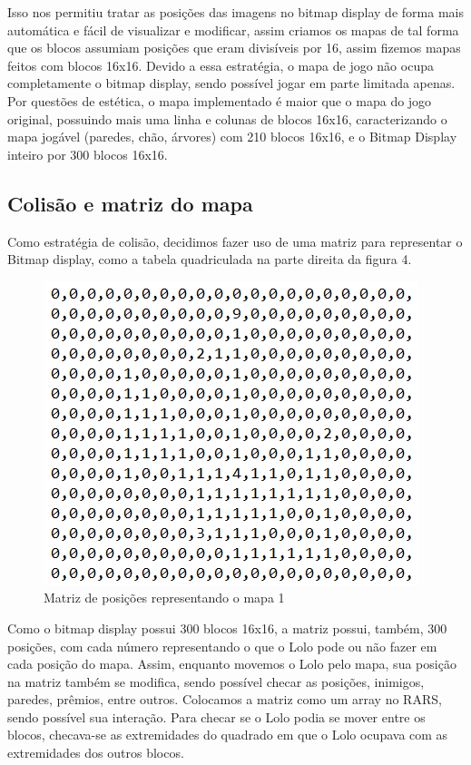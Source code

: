 \documentclass[10pt, conference, compsocconf]{IEEEtran}
\begin{document}
{{Isso nos permitiu tratar as posições das imagens no bitmap display de forma mais
automática e fácil de visualizar e modificar, assim criamos os mapas de tal
forma que os blocos assumiam posições que eram divisíveis por 16, assim fizemos
mapas feitos com blocos 16x16. Devido a essa estratégia, o mapa de jogo não
ocupa completamente o bitmap display, sendo possível jogar em parte limitada
apenas. Por questões de estética, o mapa implementado é maior que o mapa do jogo
original, possuindo mais uma linha e colunas de blocos 16x16, caracterizando o
mapa jogável (paredes, chão, árvores) com 210 blocos 16x16, e o Bitmap Display
inteiro por 300 blocos 16x16.

}




\subsection{Colisão e matriz do mapa}{
\label{sec:Mars}
Como estratégia de colisão, decidimos fazer uso de
uma matriz para representar o Bitmap display, como
a tabela quadriculada na parte direita da figura 4.

\begin{figure}[htb]
  \begin{center}
   \includegraphics[width=0.5\linewidth]{./Figures/image_7.png}
  \end{center}
  \caption{Matriz de posições representando o mapa 1}
  \label{fig:01}
\end{figure}

Como o bitmap display possui 300 blocos 16x16, a matriz possui, também, 300
posições, com cada número representando o que o Lolo pode ou não fazer em cada
posição do mapa. Assim, enquanto movemos o Lolo pelo mapa, sua posição na matriz
também se modifica, sendo possível checar as posições, inimigos, paredes,
prêmios, entre outros. Colocamos a matriz como um array no RARS, sendo possível
sua interação. Para checar se o Lolo podia se mover entre os blocos, checava-se
as extremidades do quadrado em que o Lolo ocupava com as extremidades dos outros
blocos.


}}
\end{document}
